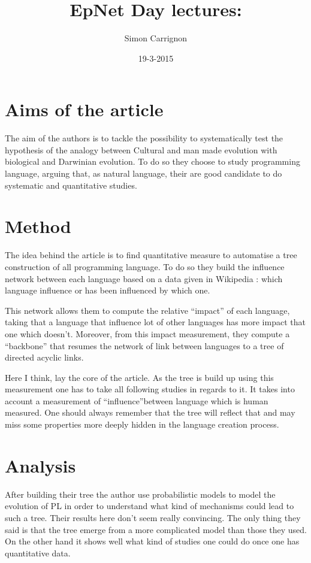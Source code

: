 \documentclass[a4paper]{article}
\title{EpNet Day lectures:\\\cite{valverde2015punctuatedequilibriuminthelargescaleevolutionofprogramminglanguages}}
\author{Simon Carrignon}
\date{19-3-2015}
\begin{document}
\maketitle

\section{Aims of the article}
The aim of the authors is to tackle the possibility to systematically test the hypothesis of the analogy between Cultural and man made evolution with biological and Darwinian evolution. To do so they choose to study programming language, arguing that, as natural language, their are good candidate to do systematic and quantitative studies.

\section{Method}
The idea behind the article is to find quantitative measure to automatise a tree construction of all programming language. To do so they build the influence network between each language based on a data given in Wikipedia : which language influence or has been influenced by which one. 

This network allows them to compute the relative ``impact'' of each language, taking that a language that influence lot of other languages has more impact that one which doesn't. Moreover, from this impact measurement, they compute a ``backbone'' that resumes the network of link between languages to a tree of directed acyclic links. 

Here I think, lay the core  of the article. As the tree is build up using this measurement one has to take all following studies in regards to it. It takes into account a measurement of ``influence''between language which is human measured. One should always remember that the tree will reflect that and may miss some properties more deeply hidden in the language creation process.


\section{Analysis}

After building their tree the author use probabilistic models to model the evolution of PL in order to understand what kind of mechanisms could lead to such a tree. Their results here don't seem really convincing.  The only thing they said is that the tree emerge from a more complicated model than those they used. On the other hand it shows well what kind of studies one could do once one has quantitative data.
\end{document}
